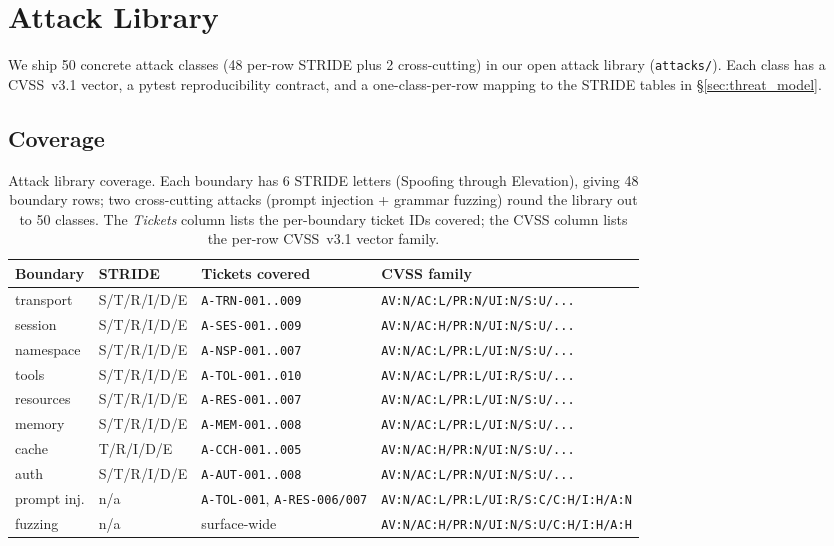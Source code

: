 
\section{Attack Library}\label{sec:attacks}

We ship 50 concrete attack classes (48 per-row STRIDE plus 2
cross-cutting) in our open attack library
(\texttt{attacks/}). Each class has a CVSS~v3.1 vector, a
pytest reproducibility contract, and a one-class-per-row
mapping to the STRIDE tables in \S\ref{sec:threat_model}.

\subsection{Coverage}

\begin{table}[t]
\caption{Attack library coverage. Each boundary has 6 STRIDE
letters (Spoofing through Elevation), giving 48 boundary rows;
two cross-cutting attacks (prompt injection + grammar fuzzing)
round the library out to 50 classes. The \emph{Tickets} column
lists the per-boundary ticket IDs covered; the CVSS column
lists the per-row CVSS~v3.1 vector family.}
\label{tab:coverage}
\centering
\small
\begin{tabularx}{\linewidth}{l l X X}
\toprule
Boundary & STRIDE & Tickets covered & CVSS family \\
\midrule
transport    & S/T/R/I/D/E & \texttt{A-TRN-001..009} & \texttt{AV:N/AC:L/PR:N/UI:N/S:U/...} \\
session      & S/T/R/I/D/E & \texttt{A-SES-001..009} & \texttt{AV:N/AC:H/PR:N/UI:N/S:U/...} \\
namespace    & S/T/R/I/D/E & \texttt{A-NSP-001..007} & \texttt{AV:N/AC:L/PR:L/UI:N/S:U/...} \\
tools        & S/T/R/I/D/E & \texttt{A-TOL-001..010} & \texttt{AV:N/AC:L/PR:L/UI:R/S:U/...} \\
resources    & S/T/R/I/D/E & \texttt{A-RES-001..007} & \texttt{AV:N/AC:L/PR:L/UI:N/S:U/...} \\
memory       & S/T/R/I/D/E & \texttt{A-MEM-001..008} & \texttt{AV:N/AC:L/PR:L/UI:N/S:U/...} \\
cache        & T/R/I/D/E   & \texttt{A-CCH-001..005} & \texttt{AV:N/AC:H/PR:N/UI:N/S:U/...} \\
auth         & S/T/R/I/D/E & \texttt{A-AUT-001..008} & \texttt{AV:N/AC:L/PR:N/UI:N/S:U/...} \\
prompt inj.  & n/a         & \texttt{A-TOL-001}, \texttt{A-RES-006/007} & \texttt{AV:N/AC:L/PR:L/UI:R/S:C/C:H/I:H/A:N} \\
fuzzing      & n/a         & surface-wide          & \texttt{AV:N/AC:H/PR:N/UI:N/S:U/C:H/I:H/A:H} \\
\bottomrule
\end{tabularx}
\end{table}

